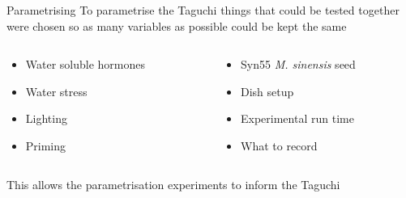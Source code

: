 \documentclass[10pt]{beamer}
\begin{document}
\begin{frame}{Parametrising}
		To parametrise the Taguchi things that could be tested together were 
chosen so as many variables as possible could be kept the same \\ \vspace{10mm}
  \begin{columns}[T]
    \begin{column}{.5\textwidth}
        \begin{itemize}
            \item Water soluble hormones
            \item Water stress
            \item Lighting
            \item Priming
        \end{itemize}
    \end{column}
    \begin{column}{.5\textwidth}
        \begin{itemize}
            \item Syn55 \textit{M. sinensis} seed
            \item Dish setup
            \item Experimental run time
            \item What to record
        \end{itemize}
    \end{column}
  \end{columns}
  \vspace{10mm}
  This allows the parametrisation experiments to inform the Taguchi
\end{frame}
\end{document}
